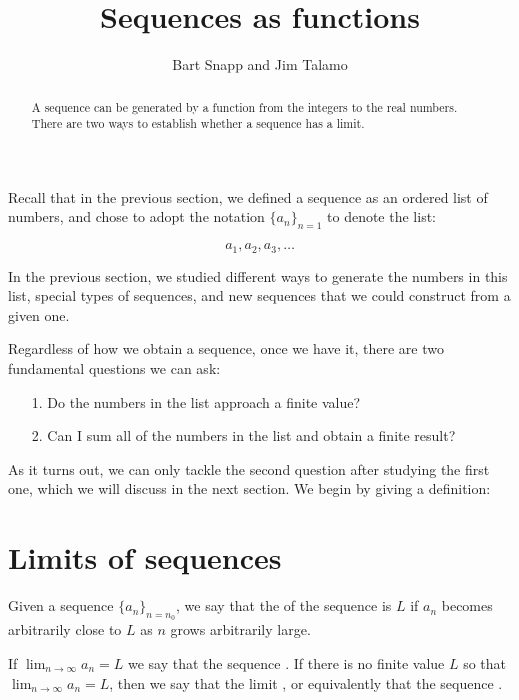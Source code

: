 \documentclass{ximera}
\author{Bart Snapp and Jim Talamo}
\title[Dig-In:]{Sequences as functions}
\begin{document}
\begin{abstract}
A sequence can be generated by a function from the integers to the real numbers.  There are two ways to establish whether a sequence has a limit.
\end{abstract}
\maketitle

Recall that in the previous section, we defined a sequence as an ordered list of numbers, and chose to adopt the notation $\{a_n\}_{n=1}$ to denote the list:

\[
a_1, a_2, a_3 , \ldots
\]

In the previous section, we studied different ways to generate the numbers in this list, special types of sequences, and new sequences that we could construct from a given one.  

Regardless of how we obtain a sequence, once we have it, there are two fundamental questions we can ask:

\begin{itemize}
\item[1.] Do the numbers in the list approach a finite value?
\item[2.] Can I sum all of the numbers in the list and obtain a finite result?
\end{itemize}

As it turns out, we can only tackle the second question after studying the first one, which we will discuss in the next section.  We begin by giving a definition:


\section{Limits of sequences}



\begin{definition}
  Given a sequence $\{a_n\}_{n =n_0}$, we say that the  of the sequence is $L$ if $a_n$ becomes arbitrarily close to $L$ as $n$ grows arbitrarily large.
  
If $\lim_{n\to\infty}a_n=L$ we say that the sequence
.
If there is no finite value $L$ so that $\lim_{n\to\infty}a_n = L$,
then we say that the limit , or equivalently that
the sequence .
\end{definition}
\end{document}
